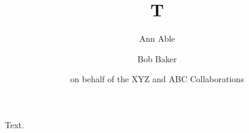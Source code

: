 \documentclass{elsarticle}
\begin{document}
\begin{frontmatter}
\title{T}
\author{Ann Able}
\author{Bob Baker}
\address{Univ X}
\author{on behalf of the XYZ and ABC Collaborations}
\end{frontmatter}
Text.
\end{document}
